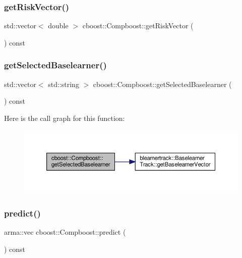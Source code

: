 \subsubsection{\texorpdfstring{get\+Risk\+Vector()}{getRiskVector()}}
{\footnotesize\ttfamily std\+::vector$<$ double $>$ cboost\+::\+Compboost\+::get\+Risk\+Vector (\begin{DoxyParamCaption}{ }\end{DoxyParamCaption}) const}

\mbox{\label{classcboost_1_1_compboost_ac66d4490e6539832d4d304a86db746dc}} 
\subsubsection{\texorpdfstring{get\+Selected\+Baselearner()}{getSelectedBaselearner()}}
{\footnotesize\ttfamily std\+::vector$<$ std\+::string $>$ cboost\+::\+Compboost\+::get\+Selected\+Baselearner (\begin{DoxyParamCaption}{ }\end{DoxyParamCaption}) const}

Here is the call graph for this function\+:\nopagebreak
\begin{figure}[H]
\begin{center}
\leavevmode
\includegraphics[width=350pt]{classcboost_1_1_compboost_ac66d4490e6539832d4d304a86db746dc_cgraph}
\end{center}
\end{figure}
\mbox{\label{classcboost_1_1_compboost_a32d1066a24607ff6ef2f934002adf62b}} 
\subsubsection{\texorpdfstring{predict()}{predict()}\hspace{0.1cm}{\footnotesize\ttfamily [1/2]}}
{\footnotesize\ttfamily arma\+::vec cboost\+::\+Compboost\+::predict (\begin{DoxyParamCaption}{ }\end{DoxyParamCaption}) const}

